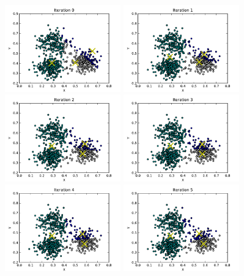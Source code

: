\begin{figure}[htbp]
\begin{center}
\includegraphics[width=5cm]{slike/kmeans-scatter-000.pdf}
\includegraphics[width=5cm]{slike/kmeans-scatter-001.pdf}
\includegraphics[width=5cm]{slike/kmeans-scatter-002.pdf}
\includegraphics[width=5cm]{slike/kmeans-scatter-003.pdf}
\includegraphics[width=5cm]{slike/kmeans-scatter-004.pdf}
\includegraphics[width=5cm]{slike/kmeans-scatter-005.pdf}

\end{center}
\end{figure}
